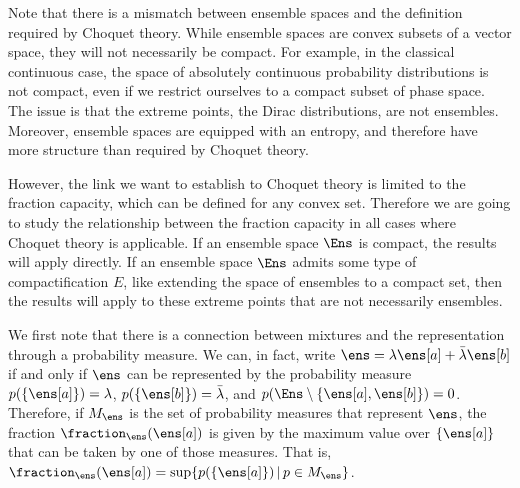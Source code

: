 Note that there is a mismatch between ensemble spaces and the definition required by Choquet theory. While ensemble spaces are convex subsets of a vector space, they will not necessarily be compact. For example, in the classical continuous case, the space of absolutely continuous probability distributions is not compact, even if we restrict ourselves to a compact subset of phase space. The issue is that the extreme points, the Dirac distributions, are not ensembles. Moreover, ensemble spaces are equipped with an entropy, and therefore have more structure than required by Choquet theory.

However, the link we want to establish to Choquet theory is limited to the fraction capacity, which can be defined for any convex set. Therefore we are going to study the relationship between the fraction capacity in all cases where Choquet theory is applicable. If an ensemble space $\Ens$ is compact, the results will apply directly. If an ensemble space $\Ens$ admits some type of compactification $E$, like extending the space of ensembles to a compact set, then the results will apply to these extreme points that are not necessarily ensembles.

We first note that there is a connection between mixtures and the representation through a probability measure. We can, in fact, write $\ens = \lambda \ens[a] + \bar{\lambda} \ens[b]$ if and only if $\ens$ can be represented by the probability measure $p(\{\ens[a]\}) = \lambda$, $p(\{\ens[b]\}) = \bar{\lambda}$, and $p(\Ens \setminus \{\ens[a], \ens[b]\}) = 0$. Therefore, if $M_{\ens}$ is the set of probability measures that represent $\ens$, the fraction $\fraction_{\ens}(\ens[a])$ is given by the maximum value over $\{\ens[a]\}$ that can be taken by one of those measures. That is,  $\fraction_{\ens}(\ens[a]) = \sup \{ p(\{\ens[a]\}) \, | \, p \in M_{\ens} \}$.

